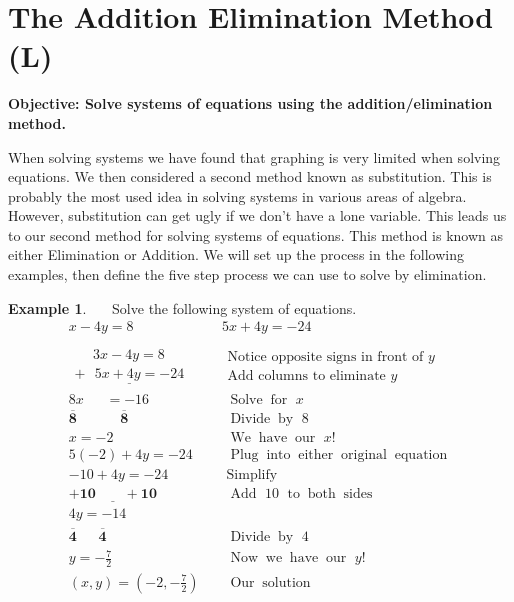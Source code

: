 \documentclass[12pt]{book}
\theoremstyle{definition}
\newtheorem{example}{Example}
\newcommand{\tmmathbf}[1]{\ensuremath{\boldsymbol{#1}}}
\newcommand{\tmop}[1]{\ensuremath{\operatorname{#1}}}
\begin{document}
\section{The Addition Elimination Method (L)}
{\bf Objective: Solve systems of equations using the addition/elimination method.}\par
When solving systems we have found that graphing is very limited when solving equations. We then considered a second method known as substitution. This is probably the most used idea in solving systems in various areas of algebra. However, substitution can get ugly if we don't have a lone variable. This leads us to our second method for solving systems of equations. This method is known as either Elimination or Addition. We will set up the process in the following examples, then define the five step process we can use to solve by elimination.
\begin{example}~~~Solve the following system of equations.
\begin{eqnarray*}
x - 4 y = 8 & & 5 x + 4 y = - 24\\
& & \\
    \begin{array}{l}
      ~~~~~~3 x - 4 y = 8\\
      \underline{\tmmathbf{+}~~~5 x + 4 y = - 24}
    \end{array} &  & \begin{array}{l}
     \text{Notice~opposite~signs~in~front~of~} y\\
			\text{Add~columns~to~eliminate~} y
    \end{array}\\ %
    8 x ~~~~~~~= - 16~ &  & \tmop{~Solve} \tmop{for~} x\\
    \tmmathbf{\overline{8} ~~~~~~~~~~~~~~ \overline{8}}~~  &  & \tmop{~Divide} \tmop{by~} 8\\
    x = - 2~~~ &  & \tmop{~We} \tmop{have} \tmop{our~} x!\\
    5 (- 2) + 4 y = - 24~ &  & \tmop{~Plug} \tmop{into} \tmop{either}
    \tmop{original} \tmop{equation}\\
    - 10 + 4 y = - 24~ &  &\tmop{~Simplify}\\
    \tmmathbf{\underline{+ 10 ~~~~~~~~~+ 10}} &  &  \tmop{~Add~} 10 \tmop{~to} \tmop{both} \tmop{sides}\\
    4 y = - 14~ &  & \\
    \tmmathbf{\overline{4} ~~~~~~~ \overline{4}}~~  &  & \tmop{~Divide} \tmop{by~} 4\\
    y = -\frac{7}{2}~ &  & \tmop{~Now} \tmop{we} \tmop{have} \tmop{our~} y!\\
    (x,y)=\left( - 2, -\frac{7}{2} \right) &  & \tmop{~Our} \tmop{solution}
  \end{eqnarray*}
\end{example}
\end{document}
